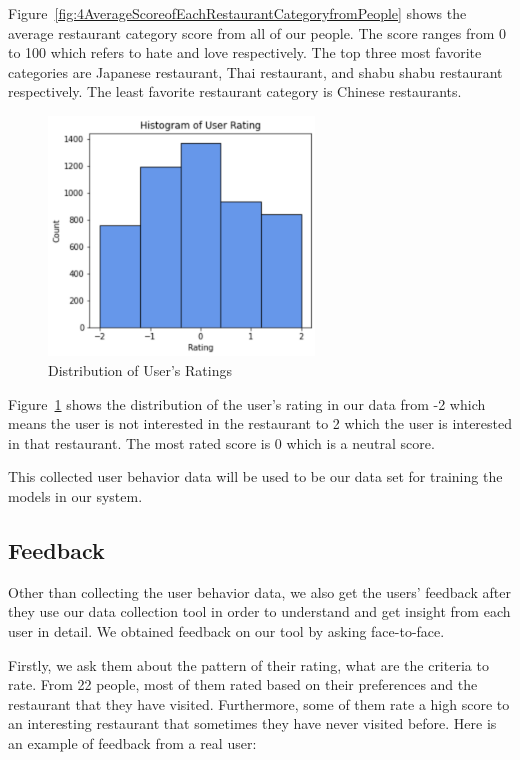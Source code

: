 \documentclass[12pt,oneside,openright,a4paper]{cpe-english-project}
\begin{document}
Figure~\ref{fig:4AverageScoreofEachRestaurantCategoryfromPeople} shows the average restaurant category score from all of our people. The score ranges from 0 to 100 which refers to hate and love respectively. The top three most favorite categories are Japanese restaurant, Thai restaurant, and shabu shabu restaurant respectively. The least favorite restaurant category is Chinese restaurants.

\begin{figure}[H]\centering
\includegraphics[width=200pt]{./images/4DistributionofUsersRatings.png}
\caption{Distribution of User’s Ratings}\label{fig:4DistributionofUsersRatings}
\end{figure}\vspace{-24pt}

Figure~\ref{fig:4DistributionofUsersRatings} shows the distribution of the user’s rating in our data from -2 which means the user is not interested in the restaurant to 2 which the user is interested in that restaurant. The most rated score is 0 which is a neutral score.

This collected user behavior data will be used to be our data set for training the models in our system.


\subsection{Feedback}

Other than collecting the user behavior data, we also get the users’ feedback after they use our data collection tool in order to understand and get insight from each user in detail. We obtained feedback on our tool by asking face-to-face.

Firstly, we ask them about the pattern of their rating, what are the criteria to rate. From 22 people, most of them rated based on their preferences and the restaurant that they have visited. Furthermore, some of them rate a high score to an interesting restaurant that sometimes they have never visited before. Here is an example of feedback from a real user:
\end{document}
